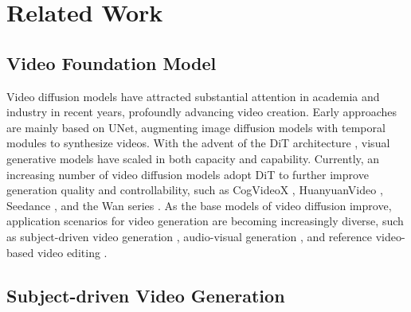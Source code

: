 \section{Related Work}

\subsection{Video Foundation Model}

Video diffusion models have attracted substantial attention in academia and industry in recent years, profoundly advancing video creation. Early approaches \cite{ho2022video, svd,guo2024animatediff} are mainly based on UNet, augmenting image diffusion models with temporal modules to synthesize videos. With the advent of the DiT architecture \cite{DiT}, visual generative models have scaled in both capacity and capability. Currently, an increasing number of video diffusion models adopt DiT to further improve generation quality and controllability, such as CogVideoX \cite{yang2024cogvideox}, HuanyuanVideo \cite{kong2024hunyuanvideo}, Seedance \cite{chen2025seedance}, and the Wan series \cite{wan2025wan}. As the base models of video diffusion improve, application scenarios\cite{phantom,hunyuancustom,chen2025humo,ye2026unified,ye2026visual,cai2026foundation,ye2025stylemaster,yang2025infinitetalk,ditto1m,insvie,reco} for video generation are becoming increasingly diverse, such as subject-driven video generation \cite{phantom,hunyuancustom,chen2025humo}, audio-visual generation \cite{chen2025humo,yang2025infinitetalk}, and reference video-based video editing \cite{ditto1m,insvie,reco}. 


\subsection{Subject-driven Video Generation}

